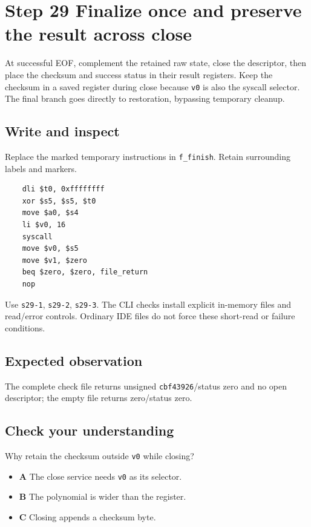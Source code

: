 \section{Step 29 Finalize once and preserve the result across close}\label{crc-s29}

At successful EOF, complement the retained raw state, close the descriptor, then place the checksum and success status in their result registers. Keep the checksum in a saved register during close because \texttt{v0} is also the syscall selector. The final branch goes directly to restoration, bypassing temporary cleanup.

\subsection{Write and inspect}
Replace the marked temporary instructions in \texttt{f\_finish}. Retain surrounding labels and markers.

\begin{verbatim}
    dli $t0, 0xffffffff
    xor $s5, $s5, $t0
    move $a0, $s4
    li $v0, 16
    syscall
    move $v0, $s5
    move $v1, $zero
    beq $zero, $zero, file_return
    nop
\end{verbatim}

Use \texttt{s29-1}, \texttt{s29-2}, \texttt{s29-3}. The CLI checks install explicit in-memory files and read/error controls. Ordinary IDE files do not force these short-read or failure conditions.

\subsection{Expected observation}
The complete check file returns unsigned \texttt{cbf43926}/status zero and no open descriptor; the empty file returns zero/status zero.

\subsection{Check your understanding}
Why retain the checksum outside \texttt{v0} while closing?

\begin{itemize}
  \item \textbf{A} The close service needs \texttt{v0} as its selector.
  \item \textbf{B} The polynomial is wider than the register.
  \item \textbf{C} Closing appends a checksum byte.
\end{itemize}
